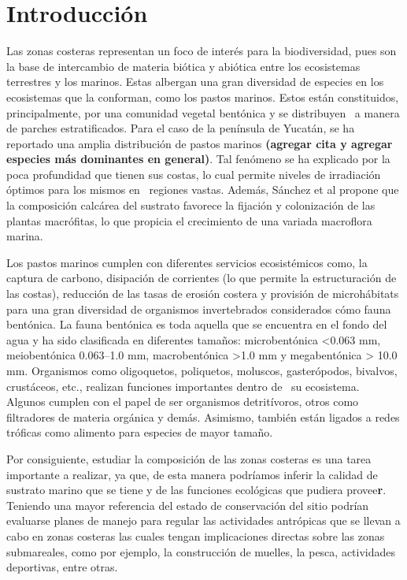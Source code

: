 \documentclass[
  authoryear,
  preprint,
  3p,
  twocolumn]{elsarticle}
\begin{document}
\hypertarget{introducciuxf3n}{%
\section{Introducción}\label{introducciuxf3n}}

Las zonas costeras representan un foco de interés para la biodiversidad,
pues son la base de intercambio de materia biótica y abiótica entre los
ecosistemas terrestres y los marinos. Estas albergan una gran diversidad
de especies en los ecosistemas que la conforman, como los pastos
marinos. Estos están constituidos, principalmente, por una comunidad
vegetal bentónica\citep{herrera2019pastos} y se distribuyen~ a manera de
parches estratificados. Para el caso de la península de Yucatán, se ha
reportado una amplia distribución de pastos marinos \textbf{(agregar
cita y agregar especies más dominantes en general)}. Tal fenómeno se ha
explicado por la poca profundidad que tienen sus costas, lo cual permite
niveles de irradiación óptimos para los mismos en~ regiones vastas.
Además, Sánchez et al\citep{sanchez2007analisis} propone que la
composición calcárea del sustrato favorece la fijación y colonización de
las plantas macrófitas, lo que propicia el crecimiento de una variada
macroflora marina.

Los pastos marinos cumplen con diferentes servicios ecosistémicos como,
la captura de carbono, disipación de corrientes (lo que permite la
estructuración de las costas), reducción de las tasas de erosión
costera\citep{herrera2019pastos} y provisión de microhábitats para una
gran diversidad de organismos invertebrados considerados cómo fauna
bentónica. La fauna bentónica es toda aquella que se encuentra en el
fondo del agua y ha sido clasificada en diferentes tamaños:
microbentónica \textless0.063 mm, meiobentónica 0.063--1.0 mm,
macrobentónica \textgreater1.0 mm y megabentónica \textgreater{} 10.0
mm\citep{tagliapietra2010benthic}. Organismos como oligoquetos,
poliquetos, moluscos, gasterópodos, bivalvos, crustáceos, etc., realizan
funciones importantes dentro de~ su ecosistema.~ Algunos cumplen con el
papel de ser organismos detritívoros, otros como filtradores de materia
orgánica y demás. Asimismo, también están ligados a redes tróficas como
alimento para especies de mayor tamaño\citep{tagliapietra2010benthic}.

Por consiguiente, estudiar la composición de las zonas costeras es una
tarea importante a realizar, ya que, de esta manera podríamos inferir la
calidad de sustrato marino que se tiene y de las funciones ecológicas
que pudiera provee\textbf{r}. Teniendo una mayor referencia del estado
de conservación del sitio podrían evaluarse planes de manejo para
regular las actividades antrópicas que se llevan a cabo en zonas
costeras las cuales tengan implicaciones directas sobre las zonas
submareales, como por ejemplo, la construcción de muelles, la pesca,
actividades deportivas, entre otras.
\end{document}
